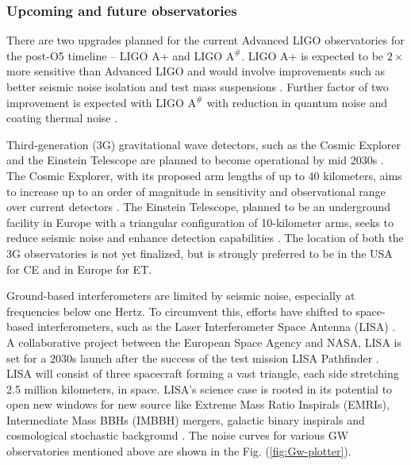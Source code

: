 \subsubsection{Upcoming and future observatories}

There are two upgrades planned for the current Advanced LIGO observatories for the post-O5 timeline -- LIGO A+ and LIGO $\text{A}^{\#}$. LIGO A+ is expected to be $2\times$ more sensitive than Advanced LIGO and would involve improvements such as better seismic noise isolation and test mass suspensions \cite{KAGRA:2013rdx}. Further factor of two improvement is expected with LIGO $\text{A}^{\#}$ with reduction in quantum noise and coating thermal noise \cite{Asharp}.


Third-generation (3G) gravitational wave detectors, such as the Cosmic Explorer and the Einstein Telescope are planned to become operational by mid 2030s \cite{Gupta:2023lga,Punturo:2010zz}. The Cosmic Explorer, with its proposed arm lengths of up to 40 kilometers, aims to increase up to an order of magnitude in sensitivity and observational range over current detectors \cite{Evans:2021gyd}. The Einstein Telescope, planned to be an underground facility in Europe with a triangular configuration of 10-kilometer arms, seeks to reduce seismic noise and enhance detection capabilities \cite{Hild:2010id}. The location of both the 3G observatories is not yet finalized, but is strongly preferred to be in the USA for CE and in Europe for ET. 

Ground-based interferometers are limited by seismic noise, especially at frequencies below one Hertz. To circumvent this, efforts have shifted to space-based interferometers, such as the Laser Interferometer Space Antenna (LISA) \cite{LISA:2017pwj}. A collaborative project between the European Space Agency and NASA, LISA is set for a 2030s launch \cite{LISA-intro, LISA:2017pwj, eLISA:2013xep} after the success of the test mission LISA Pathfinder \cite{Armano:2016bkm,McNamara:2008zz}. LISA will consist of three spacecraft forming a vast triangle, each side stretching 2.5 million kilometers, in space. LISA's science case is rooted in its potential to open new windows for new source like Extreme Mass Ratio Inspirals (EMRIs), Intermediate Mass BBHs (IMBBH) mergers, galactic binary inspirals and cosmological stochastic background \cite{eLISA:2013xep}. The noise curves for various GW observatories mentioned above are shown in the Fig. (\ref{fig:Gw-plotter}).

